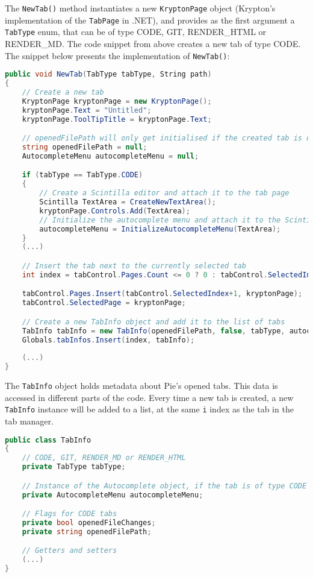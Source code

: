 The \texttt{NewTab()} method instantiates a new \texttt{KryptonPage} object (Krypton's implementation of the \texttt{TabPage} in .NET), and provides as the first argument a \texttt{TabType} enum, that can be of type CODE, GIT, RENDER\_HTML or RENDER\_MD. The code snippet from above creates a new tab of type CODE. The snippet below presents the implementation of \texttt{NewTab()}:

\begin{lstlisting}[language=csharp, caption={Implementation of the NewTab() method for CODE tabs}]
public void NewTab(TabType tabType, String path)
{
    // Create a new tab
    KryptonPage kryptonPage = new KryptonPage();
    kryptonPage.Text = "Untitled";
    kryptonPage.ToolTipTitle = kryptonPage.Text;

    // openedFilePath will only get initialised if the created tab is of RENDER\_* type
    string openedFilePath = null;
    AutocompleteMenu autocompleteMenu = null;

    if (tabType == TabType.CODE)
    {
        // Create a Scintilla editor and attach it to the tab page
        Scintilla TextArea = CreateNewTextArea();
        kryptonPage.Controls.Add(TextArea);
        // Initialize the autocomplete menu and attach it to the Scintilla editor
        autocompleteMenu = InitializeAutocompleteMenu(TextArea);
    }
    (...)

    // Insert the tab next to the currently selected tab
    int index = tabControl.Pages.Count <= 0 ? 0 : tabControl.SelectedIndex+1;

    tabControl.Pages.Insert(tabControl.SelectedIndex+1, kryptonPage);
    tabControl.SelectedPage = kryptonPage;

    // Create a new TabInfo object and add it to the list of tabs
    TabInfo tabInfo = new TabInfo(openedFilePath, false, tabType, autocompleteMenu);
    Globals.tabInfos.Insert(index, tabInfo);
    
    (...)
}
\end{lstlisting}

The \texttt{TabInfo} object holds metadata about Pie's opened tabs. This data is accessed in different parts of the code. Every time a new tab is created, a new \texttt{TabInfo} instance will be added to a list, at the same \texttt{i} index as the tab in the tab manager.

\begin{lstlisting}[language=csharp, caption={An event listener that catches tab-related key bindings in Pie}]
public class TabInfo
{
    // CODE, GIT, RENDER_MD or RENDER_HTML
    private TabType tabType;

    // Instance of the Autocomplete object, if the tab is of type CODE
    private AutocompleteMenu autocompleteMenu;

    // Flags for CODE tabs
    private bool openedFileChanges;
    private string openedFilePath;

    // Getters and setters
    (...)
}
\end{lstlisting}

